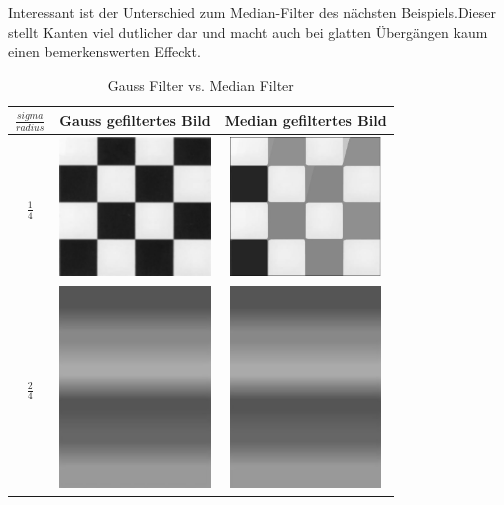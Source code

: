 \documentclass[12pt,german]{article}
\begin{document}
Interessant ist der Unterschied zum Median-Filter des nächsten Beispiels.Dieser stellt Kanten viel dutlicher dar und macht auch bei glatten Übergängen kaum einen bemerkenswerten Effeckt.
\begin{table}[h]
  \centering
  \begin{tabular}{| c | c | c |}
    \hline
    $ \frac{sigma}{radius} $ & Gauss gefiltertes Bild & Median gefiltertes Bild \\
    \hline
    $ \frac{1}{4} $ &
	\includegraphics[width=4cm]{../testData/Gauss/SchachbrettR4S2.jpg} & 	\includegraphics[width=4cm]{../testData/Median/SchachbrettR4.jpg} \\
	    \hline
    $ \frac{2}{4} $ &
	\includegraphics[width=4cm]{../testData/Gauss/RegenbogenR4S2.jpg} & 	\includegraphics[width=4cm]{../testData/Median/RegenbogenR4.jpg} \\
  \end{tabular}
  \caption{Gauss Filter vs. Median Filter}
  \label{tab:GaussMedianFilterEvaluierung}
\end{table}
\end{document}
